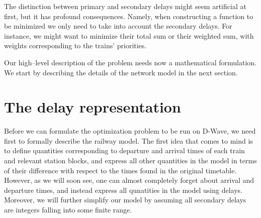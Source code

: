 The distinction between primary and secondary delays might seem artificial at
first, but it has profound consequences. Namely, when constructing a function
to be minimized we only need to take into account the secondary delays. For
instance, we might want to minimize their total sum or their weighted sum, with
weights corresponding to the trains' priorities.

Our high--level description of the problem needs now a mathematical
formulation. We start by describing the details of the network model in the
next section.

\section{The delay representation}
Before we can formulate the optimization problem to be run on D-Wave, we need
first to formally describe the railway model. The first idea that comes to mind
is to define quantities corresponding to departure and arrival times of each
train and relevant station blocks, and express all other quantities in the
model in terms of their difference with respect to the times found in the
original timetable. However, as we will soon see, one can almost completely
forget about arrival and departure times, and instead express all qunatities in
the model using delays. Moreover, we will further simplify our model by
assuming all secondary delays are integers falling into some finite range.

